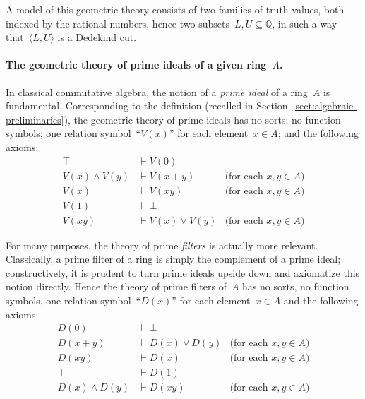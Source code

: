 \documentclass{ws-rv9x6}
\newcommand{\QQ}{\mathbb{Q}}
\renewcommand{\_}{\mathpunct{.}}
\newcommand{\?}{\,{:}\,}
\begin{document}
A model of this geometric theory consists of two families of truth values, both
indexed by the rational numbers, hence two subsets~$L,U \subseteq \QQ$, in such
a way that~$\langle L,U \rangle$ is a Dedekind cut.

\paragraph{The geometric theory of prime ideals of a given ring~$A$.} In classical
commutative algebra, the notion of a \emph{prime ideal} of a ring~$A$ is
fundamental. Corresponding to the definition (recalled in
Section~\ref{sect:algebraic-preliminaries}), the geometric theory of prime
ideals has no sorts; no function
symbols; one relation symbol~``$V(x)$'' for each element~$x \in A$; and the
following axioms:
\begin{align*}
  \top &\vdash V(0) \\
  V(x) \wedge V(y) &\vdash V(x+y) & \text{(for each~$x,y \in A$)} \\
  V(x) &\vdash V(xy) & \text{(for each~$x,y \in A$)} \\
  V(1) &\vdash \bot \\
  V(xy) &\vdash V(x) \vee V(y) & \text{(for each~$x,y \in A$)}
\end{align*}

For many purposes, the theory of prime \emph{filters} is actually more
relevant. Classically, a prime filter of a ring is simply the complement of a
prime ideal; constructively, it is prudent to turn prime ideals upside down and axiomatize this notion directly.
Hence the theory of prime filters of~$A$ has no sorts, no function symbols, one
relation symbol~``$D(x)$'' for each element~$x \in A$ and the following
axioms:
\begin{align*}
  D(0) &\vdash \bot \\
  D(x+y) &\vdash D(x) \vee D(y) & \text{(for each~$x,y \in A$)} \\
  D(xy) &\vdash D(x) & \text{(for each~$x,y \in A$)} \\
  \top &\vdash D(1) \\
  D(x) \wedge D(y) &\vdash D(xy) & \text{(for each~$x,y \in A$)}
\end{align*}
\end{document}
